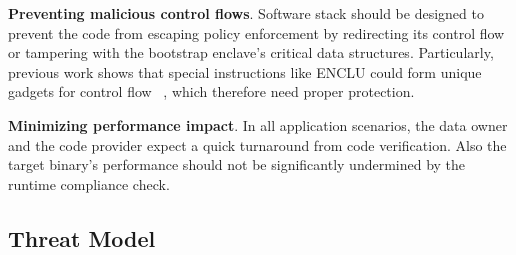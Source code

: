 
\vspace{3pt}\noindent\textbf{Preventing malicious control flows}.\label{challenge-cfi} 
Software stack should be designed to prevent the code from escaping policy enforcement by redirecting its control flow or tampering with the bootstrap enclave's critical data structures. Particularly, previous work shows that special instructions like ENCLU could form unique gadgets for control flow \DIFdelbegin {}\DIFdelend \DIFaddbegin {}\DIFaddend ~\cite{biondo2018guard}, which therefore need proper protection. 

\vspace{3pt}\noindent\textbf{Minimizing performance impact}.\label{challenge-perf} In all application scenarios, the data owner and the code provider expect a quick turnaround from code verification. Also the target binary's performance should not be significantly undermined by the runtime compliance check. 




\subsection{Threat Model}
\label{subsec-threat}

\DIFdelbegin {}\DIFdelend %

